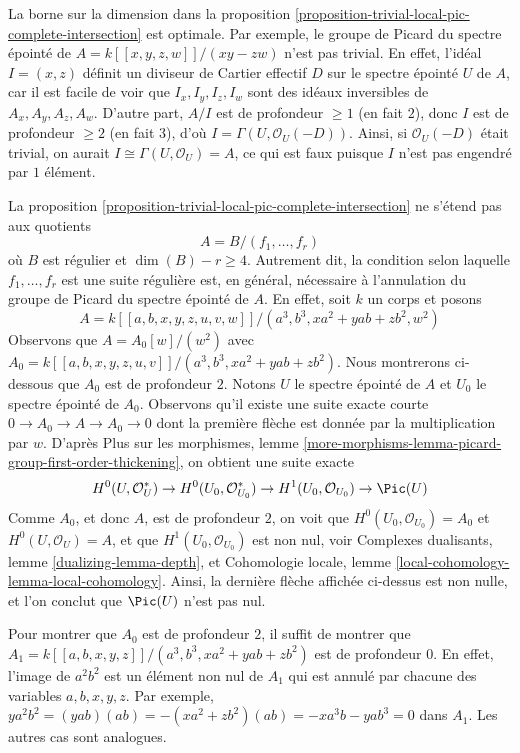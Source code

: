 \begin{example}
\label{example-grothendieck-sharp}
La borne sur la dimension dans la
proposition \ref{proposition-trivial-local-pic-complete-intersection}
est optimale. Par exemple, le groupe de Picard du spectre épointé de
$A = k[[x, y, z, w]]/(xy - zw)$ n'est pas trivial. En effet,
l'idéal $I = (x, z)$ définit un diviseur de Cartier effectif $D$ sur le spectre
épointé $U$ de $A$, car il est facile de voir que $I_x, I_y, I_z, I_w$
sont des idéaux inversibles de $A_x, A_y, A_z, A_w$. D'autre part,
$A/I$ est de profondeur $\geq 1$ (en fait $2$), donc $I$ est de profondeur $\geq 2$
(en fait $3$), d'où
$I = \Gamma(U, \mathcal{O}_U(-D))$. Ainsi, si $\mathcal{O}_U(-D)$
était trivial, on aurait $I \cong \Gamma(U, \mathcal{O}_U) = A$,
ce qui est faux puisque $I$ n'est pas engendré par $1$ élément.
\end{example}

\begin{example}
\label{example-grothendieck-sharp-bis}
La proposition \ref{proposition-trivial-local-pic-complete-intersection}
ne s'étend pas aux quotients
$$
A = B/(f_1, \ldots, f_r)
$$
où $B$ est régulier et $\dim(B) - r \geq 4$. Autrement dit, la condition selon laquelle
$f_1, \ldots, f_r$ est une suite régulière est, en général, nécessaire
à l'annulation du groupe de Picard du spectre épointé de $A$.
En effet, soit $k$ un corps et posons
$$
A = k[[a, b, x, y, z, u, v, w]]/(a^3, b^3, xa^2 + yab + zb^2, w^2)
$$
Observons que $A = A_0[w]/(w^2)$ avec
$A_0 = k[[a, b, x, y, z, u, v]]/(a^3, b^3, xa^2 + yab + zb^2)$.
Nous montrerons ci-dessous que $A_0$ est de profondeur $2$.
Notons $U$ le spectre épointé de $A$ et $U_0$ le spectre épointé
de $A_0$. Observons qu'il existe une suite exacte courte
$0 \to A_0 \to A \to A_0 \to 0$ dont la première flèche est
donnée par la multiplication par $w$.
D'après Plus sur les morphismes, lemme
\ref{more-morphisms-lemma-picard-group-first-order-thickening},
on obtient une suite exacte
$$
H^0(U, \mathcal{O}_U^*) \to
H^0(U_0, \mathcal{O}_{U_0}^*) \to
H^1(U_0, \mathcal{O}_{U_0}) \to
\Pic(U)
$$
Comme $A_0$, et donc $A$, est de profondeur $2$, on voit que
$H^0(U_0, \mathcal{O}_{U_0}) = A_0$ et $H^0(U, \mathcal{O}_U) = A$,
et que $H^1(U_0, \mathcal{O}_{U_0})$ est non nul, voir
Complexes dualisants, lemme \ref{dualizing-lemma-depth}, et
Cohomologie locale, lemme \ref{local-cohomology-lemma-local-cohomology}.
Ainsi, la dernière flèche affichée ci-dessus est non nulle, et l'on conclut
que $\Pic(U)$ n'est pas nul.

\medskip\noindent
Pour montrer que $A_0$ est de profondeur $2$, il suffit de montrer que
$A_1 = k[[a, b, x, y, z]]/(a^3, b^3, xa^2 + yab + zb^2)$
est de profondeur $0$. En effet, l'image de $a^2b^2$ est
un élément non nul de $A_1$ qui est annulé
par chacune des variables $a, b, x, y, z$. Par exemple,
$ya^2b^2 = (yab)(ab) = - (xa^2 + zb^2)(ab) = -xa^3b - yab^3 = 0$ dans $A_1$.
Les autres cas sont analogues.
\end{example}










